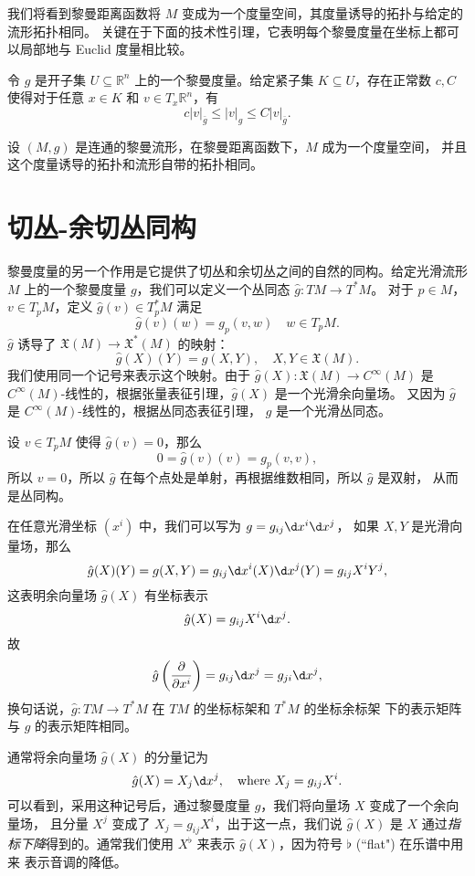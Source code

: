 我们将看到黎曼距离函数将 $M$ 变成为一个度量空间，其度量诱导的拓扑与给定的流形拓扑相同。
关键在于下面的技术性引理，它表明每个黎曼度量在坐标上都可以局部地与 Euclid 度量相比较。

\begin{lemma}
  令 $g$ 是开子集 $U\subseteq \mathbb{R}^n$ 上的一个黎曼度量。给定紧子集 
  $K\subseteq U$，存在正常数 $c,C$ 使得对于任意 $x\in K$ 和 $v\in T_x \mathbb{R}^n$，有
  \[
    c|v|_{\bar g}\leq |v|_g\leq C|v|_{\bar g}.  
  \]
\end{lemma}

\begin{theorem}[黎曼流形作为度量空间]
  设 $(M,g)$ 是连通的黎曼流形，在黎曼距离函数下，$M$ 成为一个度量空间，
  并且这个度量诱导的拓扑和流形自带的拓扑相同。
\end{theorem}


\section{切丛-余切丛同构}

黎曼度量的另一个作用是它提供了切丛和余切丛之间的自然的同构。给定光滑流形 $M$
上的一个黎曼度量 $g$，我们可以定义一个丛同态 $\hat g:TM\to T^*M$。
对于 $p\in M$，$v\in T_pM$，定义 $\hat g(v)\in T_p^*M$ 满足
\[
  \hat g(v)(w)=g_p(v,w)\quad w\in T_pM.  
\]
$\hat g$ 诱导了 $\mathfrak{X}(M)\to \mathfrak{X}^*(M)$ 的映射：
\[
  \hat g(X)(Y)=g(X,Y),\quad X,Y\in \mathfrak{X}(M).
\]
我们使用同一个记号来表示这个映射。由于 $\hat g(X):\mathfrak{X}(M)\to C^\infty(M)$
是 $C^\infty(M)$-线性的，根据张量表征引理，$\hat g(X)$ 是一个光滑余向量场。
又因为 $\hat g$ 是 $C^\infty(M)$-线性的，根据丛同态表征引理，
$\hat g$ 是一个光滑丛同态。

设 $v\in T_pM$ 使得 $\hat g(v)=0$，那么
\[
  0=\hat g(v)(v)=g_p(v,v),
\]
所以 $v=0$，所以 $\hat g$ 在每个点处是单射，再根据维数相同，所以 $\hat g$ 是双射，
从而是丛同构。

在任意光滑坐标 $(x^i)$ 中，我们可以写为 $g=g_{ij}\d x^i\d x^j$，
如果 $X,Y$ 是光滑向量场，那么
\[
  \hat g(X)(Y)=g(X,Y)=g_{ij}\d x^i(X)\d x^j(Y)=
  g_{ij}X^iY^j,  
\]
这表明余向量场 $\hat g(X)$ 有坐标表示
\[
  \hat g(X)=g_{ij}X^i\d x^j.  
\]
故
\[
  \hat g\left(\frac{\partial}{\partial x^i}\right)=
  g_{ij} \d x^j=g_{ji}\d x^j,  
\]
换句话说，$\hat g:TM\to T^*M$ 在 $TM$ 的坐标标架和 $T^*M$ 的坐标余标架
下的表示矩阵与 $g$ 的表示矩阵相同。

通常将余向量场 $\hat g(X)$ 的分量记为
\[
  \hat g(X)=X_j\d x^j,\quad \text{where $X_j=g_{ij}X^i$}.  
\]
可以看到，采用这种记号后，通过黎曼度量 $g$，我们将向量场 $X$ 变成了一个余向量场，
且分量 $X^j$ 变成了 $X_j=g_{ij}X^i$，出于这一点，我们说
$\hat g(X)$ 是 $X$ 通过\emph{指标下降}得到的。通常我们使用 
$X^\flat$ 来表示 $\hat g(X)$，因为符号 $\flat$ (``flat") 在乐谱中用来
表示音调的降低。

